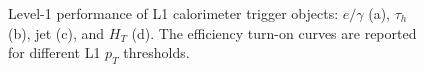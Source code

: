 \begin{figure}
    \centering
    
    \caption{Level-1 performance of L1 calorimeter trigger objects: $e/\gamma$ (a), $\tau_h$ (b), jet (c), and $H_T$ (d). The efficiency turn-on curves are reported for different L1 $p_T$ thresholds.}
    \label{fig:L1Efficiency}
\end{figure}

